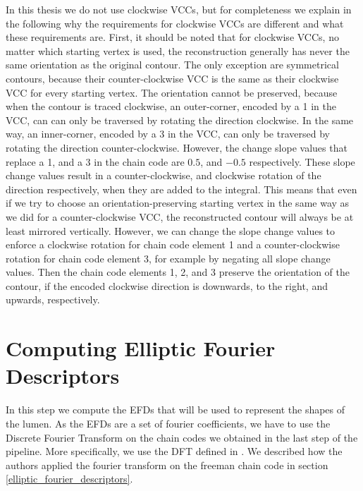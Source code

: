 \documentclass[thesis.tex]{subfiles}
\begin{document}
In this thesis we do not use clockwise VCCs, but for completeness we explain in the following why the requirements for clockwise VCCs are different and what these requirements are. First, it should be noted that for clockwise VCCs, no matter which starting vertex is used, the reconstruction generally has never the same orientation as the original contour. The only exception are symmetrical contours, because their counter-clockwise VCC is the same as their clockwise VCC for every starting vertex. The orientation cannot be preserved, because when the contour is traced clockwise, an outer-corner, encoded by a 1 in the VCC, can can only be traversed by rotating the direction clockwise. In the same way, an inner-corner, encoded by a 3 in the VCC, can only be traversed by rotating the direction counter-clockwise. However, the change slope values that replace a 1, and a 3 in the chain code are $0.5$, and $-0.5$ respectively. These slope change values result in a counter-clockwise, and clockwise rotation of the direction respectively, when they are added to the integral. This means that even if we try to choose an orientation-preserving starting vertex in the same way as we did for a counter-clockwise VCC, the reconstructed contour will always be at least mirrored vertically. However, we can change the slope change values to enforce a clockwise rotation for chain code element 1 and a counter-clockwise rotation for chain code element 3, for example by negating all slope change values. Then the chain code elements 1, 2, and 3 preserve the orientation of the contour, if the encoded clockwise direction is downwards, to the right, and upwards, respectively.    
 


\section{Computing Elliptic Fourier Descriptors}
In this step we compute the EFDs that will be used to represent the shapes of the lumen. As the EFDs are a set of fourier coefficients, we have to use the Discrete Fourier Transform on the chain codes we obtained in the last step of the pipeline. More specifically, we use the DFT defined in \cite{giardinia}. We described how the authors applied the fourier transform on the freeman chain code in section \ref{elliptic_fourier_descriptors}. 
\end{document}
